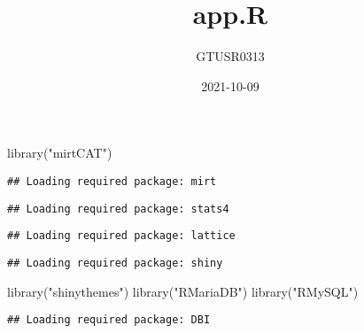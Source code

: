 \documentclass[
]{article}
\title{app.R}
\author{GTUSR0313}
\date{2021-10-09}
\newenvironment{Shaded}{\begin{snugshade}}{\end{snugshade}}
\newcommand{\FunctionTok}[1]{\textcolor[rgb]{0.00,0.00,0.00}{#1}}
\newcommand{\NormalTok}[1]{#1}
\newcommand{\StringTok}[1]{\textcolor[rgb]{0.31,0.60,0.02}{#1}}
\begin{document}
\maketitle

\begin{Shaded}
\begin{Highlighting}[]
\FunctionTok{library}\NormalTok{(}\StringTok{"mirtCAT"}\NormalTok{)}
\end{Highlighting}
\end{Shaded}

\begin{verbatim}
## Loading required package: mirt
\end{verbatim}

\begin{verbatim}
## Loading required package: stats4
\end{verbatim}

\begin{verbatim}
## Loading required package: lattice
\end{verbatim}

\begin{verbatim}
## Loading required package: shiny
\end{verbatim}

\begin{Shaded}
\begin{Highlighting}[]
\FunctionTok{library}\NormalTok{(}\StringTok{"shinythemes"}\NormalTok{)}
\FunctionTok{library}\NormalTok{(}\StringTok{"RMariaDB"}\NormalTok{)}
\FunctionTok{library}\NormalTok{(}\StringTok{"RMySQL"}\NormalTok{)}
\end{Highlighting}
\end{Shaded}

\begin{verbatim}
## Loading required package: DBI
\end{verbatim}
\end{document}
